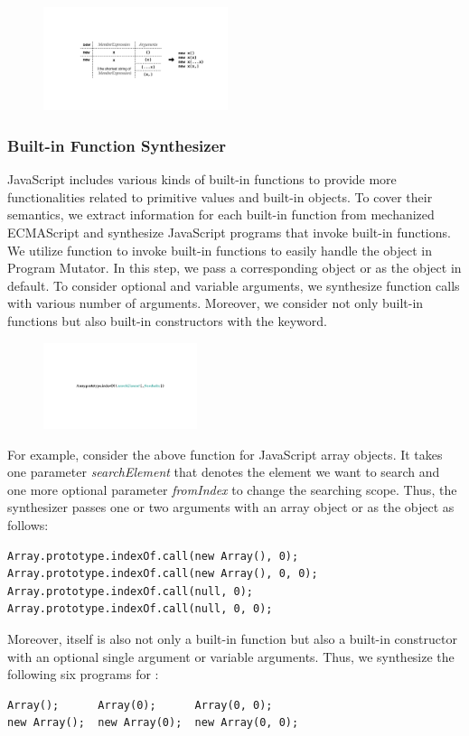\begin{figure}[H]
  \centering
  \includegraphics[width=0.48\textwidth]{img/member-example.pdf}
\end{figure}


\subsubsection{Built-in Function Synthesizer}

JavaScript includes various kinds of built-in functions to provide more
functionalities related to primitive values and built-in objects.  To cover
their semantics, we extract information for each built-in function from
mechanized ECMAScript and synthesize JavaScript programs that invoke built-in
functions.  We utilize  function to invoke
built-in functions to easily handle the  object in \textsf{Program
Mutator}.  In this step, we pass a corresponding object or  as the
 object in default.  To consider optional and variable arguments, we
synthesize function calls with various number of arguments.  Moreover, we
consider not only built-in functions but also built-in constructors with the
 keyword.

\begin{figure}[H]
  \centering
  \includegraphics[width=0.4\textwidth]{img/array-indexof.pdf}
\end{figure}

For example, consider the above  function for
JavaScript array objects.  It takes one parameter \textit{searchElement} that
denotes the element we want to search and one more optional parameter
\textit{fromIndex} to change the searching scope.  Thus, the synthesizer passes
one or two arguments with an array object or  as the 
object as follows:
\begin{lstlisting}[style=myJSstyle]
Array.prototype.indexOf.call(new Array(), 0);
Array.prototype.indexOf.call(new Array(), 0, 0);
Array.prototype.indexOf.call(null, 0);
Array.prototype.indexOf.call(null, 0, 0);
\end{lstlisting}
Moreover,  itself is also not only a built-in function but also
a built-in constructor with an optional single argument or variable arguments.
Thus, we synthesize the following six programs for :
\begin{lstlisting}[style=myJSstyle]
Array();      Array(0);      Array(0, 0);
new Array();  new Array(0);  new Array(0, 0);
\end{lstlisting}
